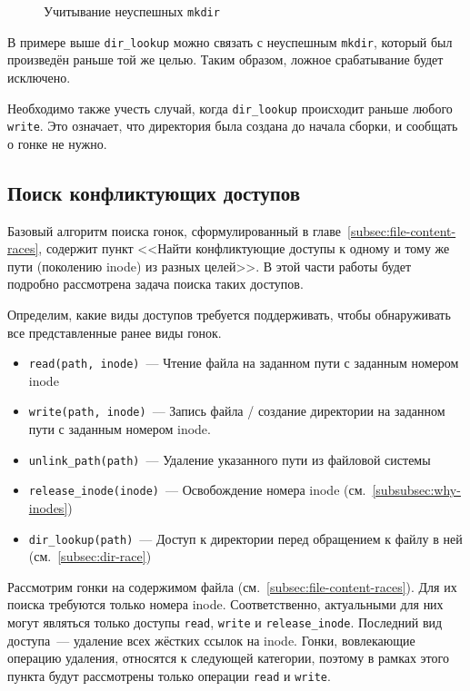 \begin{figure}[H]
    \centering
    
    \caption{Учитывание неуспешных \texttt{mkdir}}
    \label{fig:false-mkdir-conflict-fixed}
\end{figure}

В примере выше \texttt{dir\_lookup} можно связать с неуспешным \texttt{mkdir}, который был произведён раньше той же целью. Таким образом, ложное срабатывание будет исключено.

Необходимо также учесть случай, когда \texttt{dir\_lookup} происходит раньше любого \texttt{write}. Это означает, что директория была создана до начала сборки, и сообщать о гонке не нужно.

\subsection{Поиск конфликтующих доступов}
\label{subsec:cricital-accesses}

Базовый алгоритм поиска гонок, сформулированный в главе~\ref{subsec:file-content-races}, содержит пункт <<Найти конфликтующие доступы к одному и тому же пути (поколению inode) из разных целей>>. В этой части работы будет подробно рассмотрена задача поиска таких доступов.

Определим, какие виды доступов требуется поддерживать, чтобы обнаруживать все представленные ранее виды гонок.

\begin{itemize}
    \item \texttt{read(path, inode)}~--- Чтение файла на заданном пути с заданным номером inode
    \item \texttt{write(path, inode)}~--- Запись файла / создание директории на заданном пути с заданным номером inode.
    \item \texttt{unlink\_path(path)}~--- Удаление указанного пути из файловой системы
    \item \texttt{release\_inode(inode)}~--- Освобождение номера inode (см.~\ref{subsubsec:why-inodes})
    \item \texttt{dir\_lookup(path)}~--- Доступ к директории перед обращением к файлу в ней (см.~\ref{subsec:dir-race})
\end{itemize}

Рассмотрим гонки на содержимом файла (см.~\ref{subsec:file-content-races}). Для их поиска требуются только номера inode. Соответственно, актуальными для них могут являться только доступы \texttt{read}, \texttt{write} и \texttt{release\_inode}. Последний вид доступа~--- удаление всех жёстких ссылок на inode. Гонки, вовлекающие операцию удаления, относятся к следующей категории, поэтому в рамках этого пункта будут рассмотрены только операции \texttt{read} и \texttt{write}.

